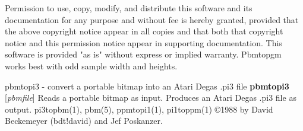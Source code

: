 Permission to use, copy, modify, and distribute this software and its
documentation for any purpose and without fee is hereby granted, provided
that the above copyright notice appear in all copies and that both that
copyright notice and this permission notice appear in supporting
documentation.  This software is provided "as is" without express or
implied warranty.
Pbmtopgm works best with odd sample width and heights.
%
 
%

\newpage
%

pbmtopi3 - convert a portable bitmap into an Atari Degas .pi3 file 
{\bf pbmtopi3}
{\rm [}{\it pbmfile}{\rm ]}
Reads a portable bitmap as input.
Produces an Atari Degas .pi3 file as output.
pi3topbm(1), pbm(5), ppmtopi1(1), pi1toppm(1)
\copyright 1988 by David Beckemeyer (bdt!david) and Jef Poskanzer.
%
 
%

\newpage
%

